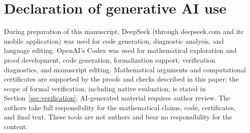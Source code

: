 \documentclass[11pt]{article}
\theoremstyle{remark}
\theoremstyle{definition}
\begin{document}
\section*{Declaration of generative AI use}
During preparation of this manuscript, DeepSeek (through deepseek.com and
its mobile application) was used for code generation, diagnostic analysis,
and language editing. OpenAI's Codex was used for mathematical exploration
and proof development, code generation, formalization support, verification
diagnostics, and manuscript editing. Mathematical arguments and computational
certificates are supported by the proofs and checks described in this paper;
the scope of formal verification, including native evaluation, is stated in
Section~\ref{sec:verification}. AI-generated material requires author review.
The authors take full responsibility for the mathematical claims, code,
certificates, and final text. These tools are not authors and bear no
responsibility for the content.
\end{document}
